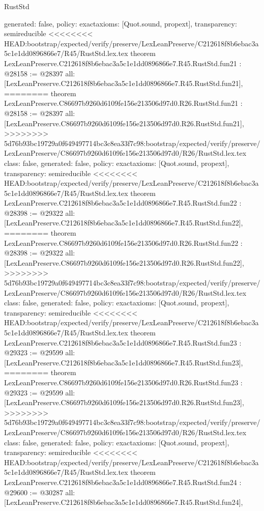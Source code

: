 \begin{lexlean}{RustStd}
\begin{coremodule}
{\begin{coremodule}
{{{{{{{{{{{{{{{{{{{{{{{{  generated: false,
  policy: exact{axioms: [Quot.sound, propext]},
  transparency: semireducible
}
<<<<<<<< HEAD:bootstrap/expected/verify/preserve/LexLeanPreserve/C212618f8b6ebac3a5c1e1dd0896866e7/R45/RustStd.lex.tex
theorem LexLeanPreserve.C212618f8b6ebac3a5c1e1dd0896866e7.R45.RustStd.fun21 : @28158 := @28397 {
  all: [LexLeanPreserve.C212618f8b6ebac3a5c1e1dd0896866e7.R45.RustStd.fun21],
========
theorem LexLeanPreserve.C86697b9260d6109fe156e213506d97d0.R26.RustStd.fun21 : @28158 := @28397 {
  all: [LexLeanPreserve.C86697b9260d6109fe156e213506d97d0.R26.RustStd.fun21],
>>>>>>>> 5d76b93bc19729a0f649497714bc3c8ea33f7c98:bootstrap/expected/verify/preserve/LexLeanPreserve/C86697b9260d6109fe156e213506d97d0/R26/RustStd.lex.tex
  class: false,
  generated: false,
  policy: exact{axioms: [Quot.sound, propext]},
  transparency: semireducible
}
<<<<<<<< HEAD:bootstrap/expected/verify/preserve/LexLeanPreserve/C212618f8b6ebac3a5c1e1dd0896866e7/R45/RustStd.lex.tex
theorem LexLeanPreserve.C212618f8b6ebac3a5c1e1dd0896866e7.R45.RustStd.fun22 : @28398 := @29322 {
  all: [LexLeanPreserve.C212618f8b6ebac3a5c1e1dd0896866e7.R45.RustStd.fun22],
========
theorem LexLeanPreserve.C86697b9260d6109fe156e213506d97d0.R26.RustStd.fun22 : @28398 := @29322 {
  all: [LexLeanPreserve.C86697b9260d6109fe156e213506d97d0.R26.RustStd.fun22],
>>>>>>>> 5d76b93bc19729a0f649497714bc3c8ea33f7c98:bootstrap/expected/verify/preserve/LexLeanPreserve/C86697b9260d6109fe156e213506d97d0/R26/RustStd.lex.tex
  class: false,
  generated: false,
  policy: exact{axioms: [Quot.sound, propext]},
  transparency: semireducible
}
<<<<<<<< HEAD:bootstrap/expected/verify/preserve/LexLeanPreserve/C212618f8b6ebac3a5c1e1dd0896866e7/R45/RustStd.lex.tex
theorem LexLeanPreserve.C212618f8b6ebac3a5c1e1dd0896866e7.R45.RustStd.fun23 : @29323 := @29599 {
  all: [LexLeanPreserve.C212618f8b6ebac3a5c1e1dd0896866e7.R45.RustStd.fun23],
========
theorem LexLeanPreserve.C86697b9260d6109fe156e213506d97d0.R26.RustStd.fun23 : @29323 := @29599 {
  all: [LexLeanPreserve.C86697b9260d6109fe156e213506d97d0.R26.RustStd.fun23],
>>>>>>>> 5d76b93bc19729a0f649497714bc3c8ea33f7c98:bootstrap/expected/verify/preserve/LexLeanPreserve/C86697b9260d6109fe156e213506d97d0/R26/RustStd.lex.tex
  class: false,
  generated: false,
  policy: exact{axioms: [Quot.sound, propext]},
  transparency: semireducible
}
<<<<<<<< HEAD:bootstrap/expected/verify/preserve/LexLeanPreserve/C212618f8b6ebac3a5c1e1dd0896866e7/R45/RustStd.lex.tex
theorem LexLeanPreserve.C212618f8b6ebac3a5c1e1dd0896866e7.R45.RustStd.fun24 : @29600 := @30287 {
  all: [LexLeanPreserve.C212618f8b6ebac3a5c1e1dd0896866e7.R45.RustStd.fun24],
}}}}}}}}}}}}}}}}}}}}}}}}}}}
\end{coremodule}}
\end{coremodule}
\end{lexlean}
